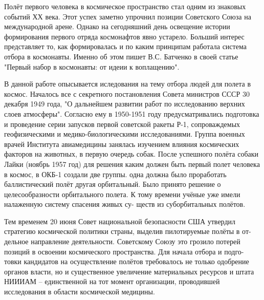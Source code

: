 
\title{}
\author{max-wn}
\date{April 12, 1961}



\maketitle
\newpage

\large{Полёт первого человека в космическое пространство стал одним из знаковых событий ХХ века. Этот успех заметно упрочнил позиции Советского Союза на международной арене. Однако на сегодняшний день освещение истории формирования первого отряда космонафтов явно устарело. Больший интерес представляет то, как формировалась и по каким принципам работала система отбора в космонавты. Именно об этом пишет В.С. Батченко в своей статье "Первый набор в космонавты: от идеии к воплащению".}


В данной работе опысывается иследования на тему отбора людей для полета в космос. Началось все с секретного постановления Совета министров СССР 30 декабря 1949 года, "О дальнейшем развитии работ по исследованию верхних слоев атмосферы". Согласно ему в 1950-1951 году предусматривались подготовка и проведение серии запусков первой советской ракеты Р-1, сопроваждемых геофизическими и медико-биологическими исследованиями. Группа военных врачей Института авиамедицины занялась изучением влияния космических факторов на животных, в первую очередь собак. После успешного полёта собаки Лайки (ноябрь 1957 год) для решения каким должен быть первый полет человека в космос, в ОКБ-1 создали две группы. одна должна было проработать баллистический полёт другая орбитальный. Было принято решение о целесообразности орбитального полета. К тому времени учёные уже имели налаженную систему спасения живых су-
ществ из суборбитальных полётов.

Тем временем 20 июня Совет национальной безопасности США утвердил
стратегию космической политики страны, выделив пилотируемые полёты в от-
дельное направление деятельности. Советскому Союзу это грозило потерей
позиций в освоении космического пространства. Для начала отбора и подго-
товки кандидатов на осуществление полётов требовалось не только одобрение
органов власти, но и существенное увеличение материальных ресурсов и штата
НИИИАМ – единственной на тот момент организации, проводившей исследования в области космической медицины.

